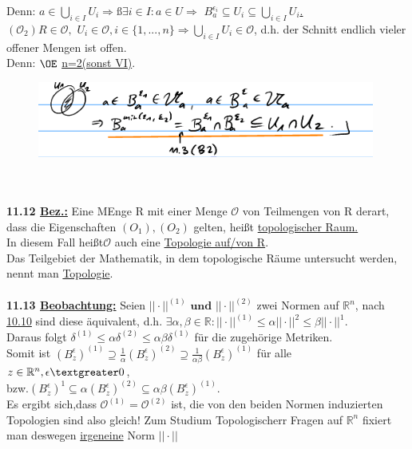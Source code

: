 \documentclass[]{scrartcl}
\begin{document}
	\textopencorner Denn: $a\in \bigcup_{i\in I} U_i\Rightarrow ß\exists i\in I: a\in U\Rightarrow$ \ul{$B_a^{\epsilon_i}\subseteq U_i\subseteq\bigcup_{i\in I} U_i$.}\textcorner\\
	$(\mathcal{O}_2) R\in \mathcal{O},$ \ul{$U_i \in \mathcal{O}, i\in \{1,...,n\}\Rightarrow\bigcup_{i\in I} U_i\in \mathcal{O}$}, d.h. der Schnitt endlich vieler offener Mengen ist offen.\\
	\textopencorner Denn: $\OE$ \ul{n=2(sonst VI)}. 
	\begin{figure}[h]
		\includegraphics[width=8 cm,height=2.5cm]{bsp kap 11}
	\end{figure}\\
	\\
	\textbf{11.12 \underline{Bez.:}} Eine MEnge R mit einer Menge $\mathcal{O}$ von Teilmengen von R derart, dass die Eigenschaften $(O_1),(O_2)$ gelten, heißt \ul{topologischer Raum.}\\
	In diesem Fall heißt$\mathcal{O}$ auch eine \ul{Topologie auf/von R}.\\
	Das Teilgebiet der Mathematik, in dem topologische Räume untersucht werden, nennt man \ul{Topologie}.\\
	\\
	\textbf{11.13 \underline{Beobachtung:}} Seien $||\cdot||^{(1)} \textbf{ und } ||\cdot||^{(2)}$ zwei Normen auf $\mathbb{R}^n$, nach \ul{10.10} sind diese äquivalent, d.h. $\exists\alpha,\beta\in \mathbb{R}:||\cdot||^{(1)} \leq \alpha||\cdot||^{2}\leq\beta||\cdot||^{1}.$\\
	Daraus folgt $\delta^{(1)} \leq \alpha\delta^{(2)}\leq \alpha\beta \delta^{(1)}$ für die zugehörige Metriken.\\
	Somit ist $(B_z^\epsilon)^{(1)} \supseteq \frac{1}{\alpha}(B_z^\epsilon)^{(2)}\supseteq \frac{1}{\alpha \beta}(B_z^\epsilon)^{(1)}$ für alle $z\in\mathbb{R}^n, \epsilon\textgreater0$,\\
	bzw.$(B_z^\epsilon)^{1}\subseteq\alpha(B_z^\epsilon)^{(2)}\subseteq\alpha\beta (B_z^\epsilon)^{(1)}$.\\
	Es ergibt sich,dass \ul{$\mathcal{O}^{(1)}=\mathcal{O}^{(2)}$} ist, die von den beiden Normen induzierten Topologien sind also gleich! Zum Studium Topologischerr Fragen auf $\mathbb{R}^n$ fixiert man deswegen \underline{irgeneine} Norm $||\cdot||$
\end{document}
